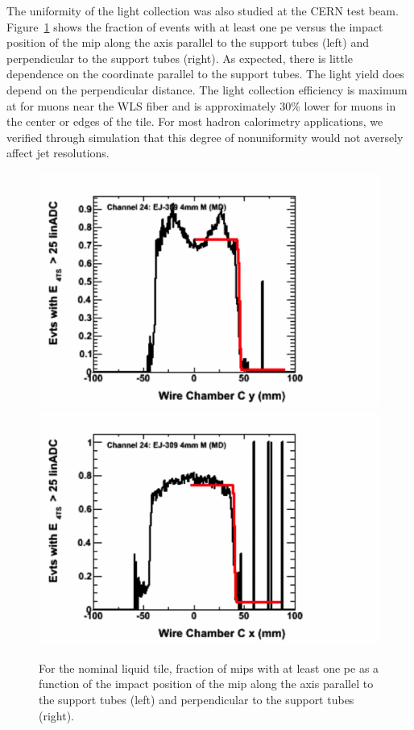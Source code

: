 \documentclass[review]{elsarticle}
\begin{document}
The uniformity of the light collection was also studied at the CERN test beam.
Figure~\ref{fig:fig1} shows the fraction of events with at least one
pe versus the impact position of the mip along the axis parallel to the support tubes (left) and perpendicular to the support tubes (right).  As expected, there is little dependence on the coordinate parallel to the support tubes.  The light yield does depend on the perpendicular distance.  The light collection efficiency is maximum at for muons near the WLS fiber and is approximately 30\% lower for muons in the center or edges of the tile.  For most hadron calorimetry applications, we verified through simulation that this degree of nonuniformity would not aversely affect jet resolutions.

\begin{figure}[h]
\centering\includegraphics[scale=0.5]{./figures/fiducial3.png}
\centering\includegraphics[scale=0.5]{./figures/fiducial2.png}
\caption{For the nominal liquid tile, fraction of mips with at least one pe as a function of the impact position of the mip along the axis parallel to the support tubes (left) and perpendicular to the support tubes (right).}
\label{fig:fig1}
\end{figure}
\end{document}
